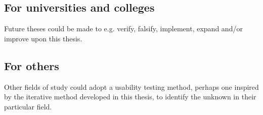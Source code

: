 \subsection{For universities and colleges}
Future theses could be made to e.g. verify, falsify, implement, expand and/or improve upon this thesis.
\subsection{For others}
Other fields of study could adopt a usability testing method, perhaps one inspired by the iterative method developed in this thesis, to identify the unknown in their particular field. 
